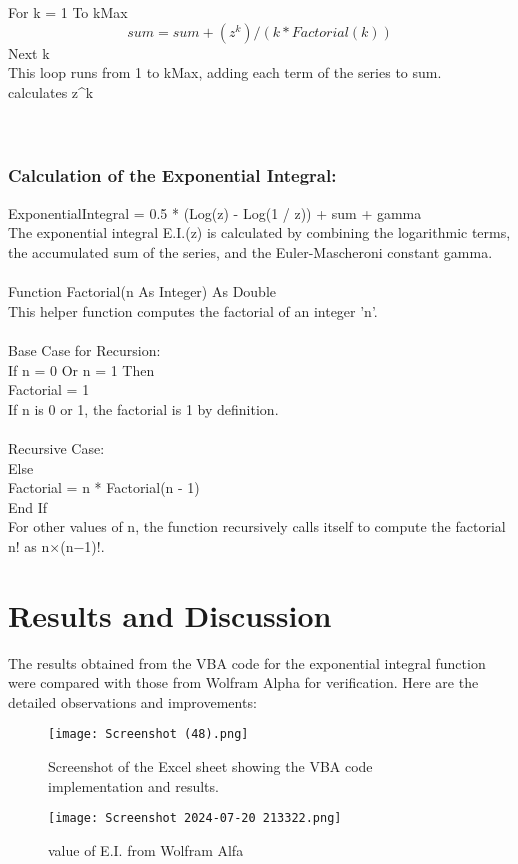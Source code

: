 \documentclass{article}
\begin{document}
For k = 1 To kMax \\
    \[sum = sum + (z^k) / (k * Factorial(k))\]
Next k\\
This loop runs from 1 to kMax, adding each term of the series to sum.\\
 calculates z^k\\
\\
\\ \subsubsection{Calculation of the Exponential Integral:}
ExponentialIntegral = 0.5 * (Log(z) - Log(1 / z)) + sum + gamma\\
The exponential integral E.I.(z) is calculated by combining the logarithmic terms, the accumulated sum of the series, and the Euler-Mascheroni constant gamma.\\
\\
Function Factorial(n As Integer) As Double\\
This helper function computes the factorial of an integer 'n'.
\\
\\Base Case for Recursion:\\
If n = 0 Or n = 1 Then\\
    Factorial = 1\\
    If n is 0 or 1, the factorial is 1 by definition.\\
\\ Recursive Case:
\\Else
    \\Factorial = n * Factorial(n - 1)\\
End If
\\
    For other values of n, the function recursively calls itself to compute the factorial n! as n×(n−1)!.

\section{Results and Discussion}
The results obtained from the VBA code for the exponential integral function were compared with those from Wolfram Alpha for verification. Here are the detailed observations and improvements:

\begin{figure}[H]
    \centering
    \texttt{[image: Screenshot (48).png]}
    \caption{Screenshot of the Excel sheet showing the VBA code implementation and results.}
    \label{fig:sheet_screenshot}
\end{figure}
\begin{figure}[H]
    \centering
    \texttt{[image: Screenshot 2024-07-20 213322.png]}
    \caption{value of E.I. from Wolfram Alfa}
    \label{fig:sheet_screenshot}
\end{figure}
\end{document}
